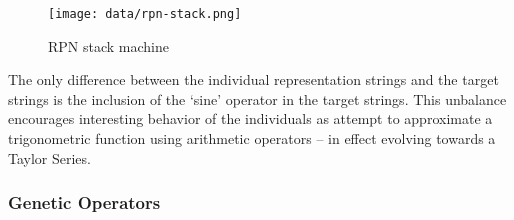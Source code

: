 \documentclass[11pt]{article}
\begin{document}
\begin{figure}[htb]
\centering
\texttt{[image: data/rpn-stack.png]}
\caption{RPN stack machine}
\end{figure}



The only difference between the individual representation strings and
the target strings is the inclusion of the `sine' operator in the
target strings.  This unbalance encourages interesting behavior of the
individuals as attempt to approximate a trigonometric function using
arithmetic operators -- in effect evolving towards a Taylor Series.

\subsubsection*{Genetic Operators}
\label{sec-1.3.2}
\end{document}
